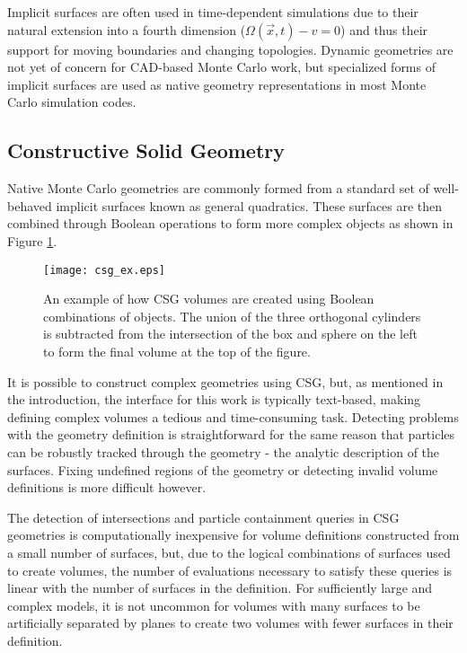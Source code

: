 Implicit surfaces are often used in time-dependent simulations due to their
natural extension into a fourth dimension ($ \Omega(\vec{x},t) - v  = 0 $) and
thus their support for moving boundaries and changing topologies. Dynamic
geometries are not yet of concern for CAD-based Monte Carlo work, but
specialized forms of implicit surfaces are used as native geometry
representations in most Monte Carlo simulation codes.

\subsection{Constructive Solid Geometry}\label{subsec:csg}

Native Monte Carlo geometries are commonly formed from a standard set of
well-behaved implicit surfaces known as general quadratics. These surfaces are
then combined through Boolean operations to form more complex objects as shown
in Figure \ref{fig:csg_ex}.

\begin{figure}[h]
  \centering
  \texttt{[image: csg\_ex.eps]}
  \caption{An example of how CSG volumes are created using Boolean combinations
    of objects. The union of the three orthogonal cylinders is
    subtracted from the intersection of the box and sphere on the left to form
    the final volume at the top of the figure.}
  \label{fig:csg_ex}
\end{figure}

It is possible to construct complex geometries using CSG, but, as mentioned in
the introduction, the interface for this work is typically text-based, making
defining complex volumes a tedious and time-consuming task. Detecting
problems with the geometry definition is straightforward for the same reason
that particles can be robustly tracked through the geometry - the analytic
description of the surfaces. Fixing undefined regions of the geometry or
detecting invalid volume definitions is more difficult however.

The detection of intersections and particle containment queries in CSG
geometries is computationally inexpensive for volume definitions constructed
from a small number of surfaces, but, due to the logical combinations of
surfaces used to create volumes, the number of evaluations necessary to satisfy
these queries is linear with the number of surfaces in the definition. For
sufficiently large and complex models, it is not uncommon for volumes with many
surfaces to be artificially separated by planes to create two volumes with fewer
surfaces in their definition.


